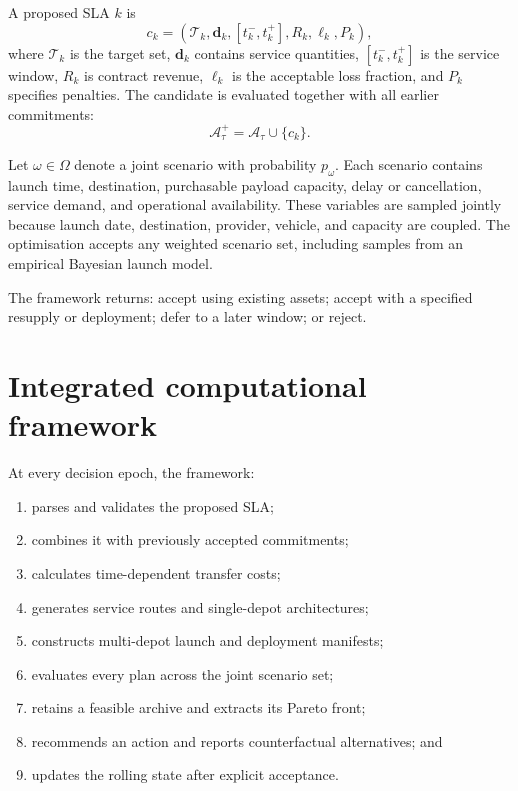 \documentclass[review,12pt,authoryear]{elsarticle}
\newcommand{\scenset}{\Omega}
\begin{document}
A proposed SLA $k$ is
\begin{equation}
 c_k=(\mathcal{T}_k,\mathbf{d}_k,[t_k^-,t_k^+],R_k,\ell_k,P_k),
\end{equation}
where $\mathcal{T}_k$ is the target set, $\mathbf{d}_k$ contains service
quantities, $[t_k^-,t_k^+]$ is the service window, $R_k$ is contract revenue,
$\ell_k$ is the acceptable loss fraction, and $P_k$ specifies penalties. The
candidate is evaluated together with all earlier commitments:
\begin{equation}
 \mathcal{A}_\tau^+=\mathcal{A}_\tau\cup\{c_k\}.
\end{equation}

Let $\omega\in\scenset$ denote a joint scenario with probability $p_\omega$.
Each scenario contains launch time, destination, purchasable payload capacity,
delay or cancellation, service demand, and operational availability. These
variables are sampled jointly because launch date, destination, provider,
vehicle, and capacity are coupled. The optimisation accepts any weighted
scenario set, including samples from an empirical Bayesian launch model.

The framework returns: accept using existing assets; accept with a specified
resupply or deployment; defer to a later window; or reject.

\section{Integrated computational framework}
\label{sec:framework}

At every decision epoch, the framework:
\begin{enumerate}
 \item parses and validates the proposed SLA;
 \item combines it with previously accepted commitments;
 \item calculates time-dependent transfer costs;
 \item generates service routes and single-depot architectures;
 \item constructs multi-depot launch and deployment manifests;
 \item evaluates every plan across the joint scenario set;
 \item retains a feasible archive and extracts its Pareto front;
 \item recommends an action and reports counterfactual alternatives; and
 \item updates the rolling state after explicit acceptance.
\end{enumerate}
\end{document}
